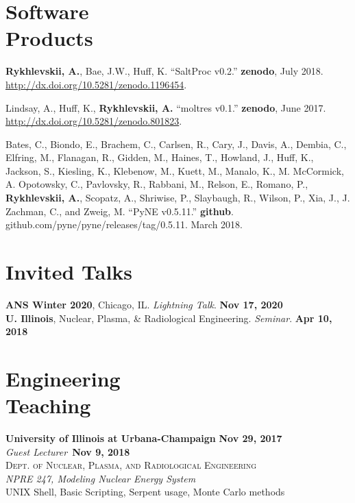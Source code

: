 \documentclass[margin,line]{resume}
\begin{document}
\begin{resume}
\section{\mysidestyle Software\\Products}
\begin{bibenum}
	\item \textbf{Rykhlevskii, A.}, Bae, J.W., Huff, K. ``SaltProc v0.2.'' 
	\textbf{zenodo}, July 2018.
	\url{http://dx.doi.org/10.5281/zenodo.1196454}.
	
	\item Lindsay, A., Huff, K., \textbf{Rykhlevskii, A.} ``moltres v0.1.'' 
	\textbf{zenodo}, June 2017. \url{http://dx.doi.org/10.5281/zenodo.801823}.
	
	\item Bates, C., Biondo, E., Brachem, C., Carlsen, R., Cary, J., Davis, 
	A., Dembia, C., Elfring, M., Flanagan, R., Gidden, M., Haines, T., 
	Howland, J., Huff, K., Jackson, S., Kiesling, K., Klebenow, M., Kuett, M., 
	Manalo, K., M. McCormick, A. Opotowsky, C., Pavlovsky, R., Rabbani, M., 
	Relson, E., Romano, P., \textbf{Rykhlevskii, A.}, Scopatz, A., Shriwise, 
	P., Slaybaugh, R., Wilson, P., Xia, J., J. Zachman, C., and Zweig, M. 
	``PyNE v0.5.11.'' \textbf{github}. 
	github.com/pyne/pyne/releases/tag/0.5.11. March 2018. 
\end{bibenum}
    \section{\mysidestyle Invited Talks}
      \textbf{ANS Winter 2020}, Chicago, IL. \emph{Lightning Talk}.  
      \hfill\textbf{Nov 17, 2020}\\
      \textbf{U. Illinois}, Nuclear, Plasma, \& Radiological Engineering. \emph{Seminar}.  \hfill\textbf{Apr 10, 2018}\\
    \section{\mysidestyle Engineering\\Teaching}
    \textbf{University of Illinois at Urbana-Champaign} \hfill \textbf{Nov 29, 2017}\\
    \textsl{Guest Lecturer}~\hfill \textbf{Nov 9, 2018}\\
    \textsc{Dept. of Nuclear, Plasma, and Radiological Engineering}\\ 
               \textsl{NPRE 247, Modeling Nuclear Energy System}\\
               UNIX Shell, Basic Scripting, Serpent usage, Monte Carlo methods
               \vspace{2mm}

\end{resume}
\end{document}
